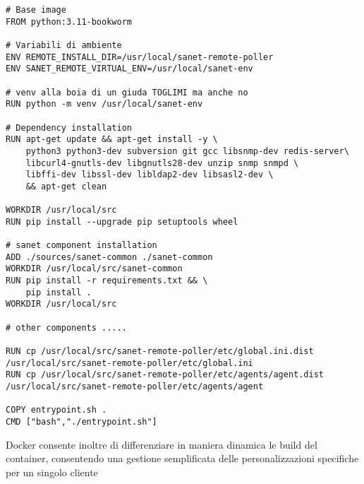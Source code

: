 \begin{lstlisting}[language=Docker]
# Base image
FROM python:3.11-bookworm

# Variabili di ambiente
ENV REMOTE_INSTALL_DIR=/usr/local/sanet-remote-poller
ENV SANET_REMOTE_VIRTUAL_ENV=/usr/local/sanet-env

# venv alla boia di un giuda TOGLIMI ma anche no
RUN python -m venv /usr/local/sanet-env

# Dependency installation
RUN apt-get update && apt-get install -y \
    python3 python3-dev subversion git gcc libsnmp-dev redis-server\
    libcurl4-gnutls-dev libgnutls28-dev unzip snmp snmpd \
    libffi-dev libssl-dev libldap2-dev libsasl2-dev \
    && apt-get clean

WORKDIR /usr/local/src
RUN pip install --upgrade pip setuptools wheel

# sanet component installation
ADD ./sources/sanet-common ./sanet-common
WORKDIR /usr/local/src/sanet-common
RUN pip install -r requirements.txt && \
    pip install .
WORKDIR /usr/local/src

# other components .....

RUN cp /usr/local/src/sanet-remote-poller/etc/global.ini.dist /usr/local/src/sanet-remote-poller/etc/global.ini
RUN cp /usr/local/src/sanet-remote-poller/etc/agents/agent.dist /usr/local/src/sanet-remote-poller/etc/agents/agent

COPY entrypoint.sh .
CMD ["bash","./entrypoint.sh"]
\end{lstlisting}

Docker consente inoltre di differenziare in maniera dinamica le build del container, consentendo una gestione semplificata delle personalizzazioni specifiche per un singolo cliente
